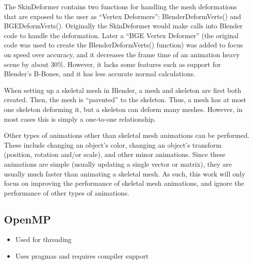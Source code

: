 
The SkinDeformer contains two functions for handling the mesh deformations that are exposed to the user as ``Vertex Deformers'': BlenderDeformVerts() and BGEDeformVerts().
Originally the SkinDeformer would make calls into Blender code to handle the deformation.
Later a ``BGE Vertex Deformer'' (the original code was used to create the BlenderDeformVerts() function) was added to focus on speed over accuracy, and it decreases the frame time of an animation heavy scene by about 30\%.
However, it lacks some features such as support for Blender's B-Bones, and it has less accurate normal calculations.

When setting up a skeletal mesh in Blender, a mesh and skeleton are first both created.
Then, the mesh is ``parented'' to the skeleton.
Thus, a mesh has at most one skeleton deforming it, but a skeleton can deform many meshes.
However, in most cases this is simply a one-to-one relationship.

Other types of animations other than skeletal mesh animations can be performed.
These include changing an object's color, changing an object's transform (position, rotation and/or scale), and other minor animations.
Since these animations are simple (usually updating a single vector or matrix), they are usually much faster than animating a skeletal mesh.
As such, this work will only focus on improving the performance of skeletal mesh animations, and ignore the performance of other types of animations.

\subsection{OpenMP}
\ifsummaries
\begin{itemize}
 \item Used for threading
 \item Uses pragmas and requires compiler support
\end{itemize}
\fi


%
